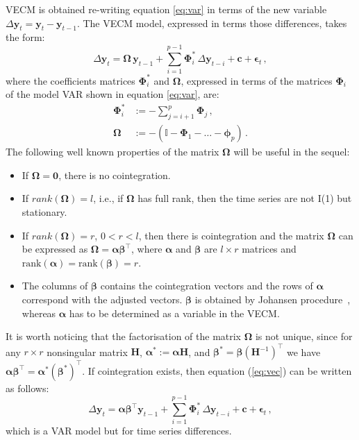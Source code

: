 VECM  is obtained re-writing equation \ref{eq:var} in terms of the new
variable $\Delta\mathbf{y}_t=\mathbf{y}_t-\mathbf{y}_{t-1}$.
The VECM model, expressed in terms those differences, takes the form:
\begin{equation}\label{eq:vec}
\Delta \mathbf{y}_t 
= \boldsymbol{\Omega}\,\mathbf{y}_{t-1}
  + \sum_{i=1}^{p-1} \boldsymbol{\Phi}_i^*\,\Delta\mathbf{y}_{t-i}
  + \mathbf{c} + \boldsymbol{\epsilon}_t\,,
\end{equation}
\noindent
where the coefficients matrices $\boldsymbol{\Phi}_i^*$ and 
$\boldsymbol{\Omega}$, expressed in terms of the matrices
$\boldsymbol{\Phi}_i$ of the model VAR shown in equation \ref{eq:var}, are:
\begin{align*}
\boldsymbol{\Phi}_i^* 
&:= -\sum_{j=i+1}^{p}\boldsymbol{\Phi}_j\,, \\
\boldsymbol{\Omega}
&:= -\left( \mathbb{I} - \boldsymbol{\Phi}_1 - \dots 
    - \boldsymbol{\phi}_p \right)\,. 
\end{align*}
The following well known properties of the matrix $\boldsymbol{\Omega}$
\cite{johansen1995} will be useful in the sequel:
\begin{itemize}
\item
If $\boldsymbol{\Omega} = \mathbf{0}$, there is no cointegration.
\item 
If $rank(\boldsymbol{\Omega})=l$, i.e., if $\boldsymbol{\Omega}$ has
full rank, then the time series are not I(1) but stationary.
\item
If $rank(\boldsymbol{\Omega})=r$, $0<r<l$, then there is cointegration
and the matrix $\boldsymbol{\Omega}$ can be expressed as
$\boldsymbol{\Omega}=\boldsymbol{\alpha\beta}^\top$, where $\boldsymbol{\alpha}$
and $\boldsymbol{\beta}$ are
$l\times r$ matrices and
$\text{rank}(\boldsymbol{\alpha})=\text{rank}(\boldsymbol{\beta})=r$.
\item
The columns of $\boldsymbol{\beta}$ contains the cointegration vectors and the rows of
$\boldsymbol{\alpha}$ correspond with the adjusted vectors. 
$\boldsymbol{\beta}$ is obtained by Johansen procedure~\cite{johansen1988},
whereas $\boldsymbol{\alpha}$ has to be determined as a variable in the VECM.
\end{itemize}
It is worth noticing that the factorisation of the matrix
$\boldsymbol\Omega$ is not unique, since for any $r \times r$
nonsingular matrix $\mathbf{H}$, $\boldsymbol{\alpha}^*:=\boldsymbol{\alpha}\mathbf{H}$,
and $\boldsymbol{\beta}^*=\boldsymbol{\beta}(\mathbf{H}^{-1})^\top$ we have
$\boldsymbol{\alpha\beta}^\top=\boldsymbol{\alpha}^*(\boldsymbol{\beta}^*)^\top$.
If cointegration exists, then equation (\ref{eq:vec}) can be written
as follows:
\begin{equation}\label{eq:vecfull}
\Delta\mathbf{y}_t 
= \boldsymbol{\alpha\beta}^\top\mathbf{y}_{t-1} 
  + \sum_{i=1}^{p-1}\boldsymbol{\Phi}_i^*\,\Delta\mathbf{y}_{t-i}
  + \mathbf{c} + \boldsymbol{\epsilon}_t\,,
\end{equation}
\noindent
which is a VAR model but for time series differences.


